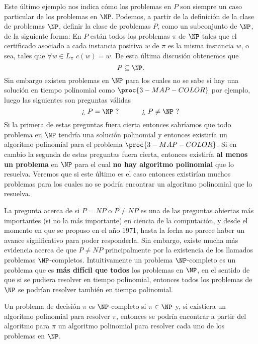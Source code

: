 Este último ejemplo nos indica cómo los problemas en $P$ son siempre un caso particular de los problemas en $\NP$.
Podemos, a partir de la definición de la clase de problemas $\NP$, definir la clase de problemas $P$, como un subconjunto de $\NP$, de la siguiente forma: En $P$ están todos los problemas $\pi$ de $\NP$ tales que el certificado asociado a cada instancia positiva $w$ de $\pi$ es la misma instancia $w$, o sea, tales que $\forall w\in L_\pi$ $c(w)=w$.
De esta última discusión %
obtenemos que 
\[
P\subseteq \NP.
\]
Sin embargo existen problemas en $\NP$ para los cuales no se sabe si hay una solución en tiempo polinomial como $\proc{3-MAP-COLOR}$ por ejemplo, luego las siguientes son preguntas válidas
\[
\text{¿ }P=\NP\text{ ?}\;\;\;\;\;\;\;\;\;\;\;\;\text{¿ }P\not=\NP\text{ ?}
\]
Si la primera de estas preguntas fuera cierta entonces sabríamos que todo problema en $\NP$ tendría una solución polinomial y entonces existiría un algoritmo polinomial para el problema $\proc{3-MAP-COLOR}$.
Si en cambio la segunda de estas preguntas fuera cierta, entonces existiría {\bf al menos un problema} en $\NP$ para el cual {\bf no hay algoritmo polinomial} que lo resuelva.
Veremos que si este último es el caso entonces existirían muchos problemas para los cuales no se podría encontrar un algoritmo polinomial que lo resuelva.

La pregunta acerca de si $P=NP$ o $P\not=NP$ es una de las preguntas abiertas más importantes (si no la más importante) en ciencia de la computación, y desde el momento en que se propuso en el año 1971, hasta la fecha no parece haber un avance significativo para poder responderla.
Sin embargo, existe mucha más evidencia acerca de que $P\not=NP$ principalmente por la existencia de los llamados problemas $\NP$-completos.
Intuitivamente un problema $\NP$-completo es un problema que es {\bf más difícil que todos} los problemas en $\NP$, en el sentido de que si se pudiera resolver en tiempo polinomial, entonces todos los problemas de $\NP$ se podrían resolver también en tiempo polinomial.

\begin{definicion}
Un problema de decisión $\pi$ es $\NP$-completo si $\pi\in\NP$ y, si existiera un algoritmo polinomial para resolver $\pi$, entonces se podría encontrar a partir del algoritmo para $\pi$ un algoritmo polinomial para resolver cada uno de los problemas en $\NP$.
\end{definicion}

